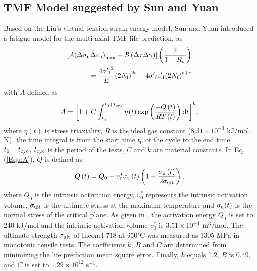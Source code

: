 \documentclass[preprint,5p,twocolumn,10pt,sort&compress]{elsarticle}
\begin{document}
\subsection{TMF Model suggested by Sun and Yuan}
Based on the Liu's virtual tension strain energy model, Sun and Yuan \cite{SUN2019228} introduced a fatigue model for the multi-axial TMF life prediction, as
\begin{equation}
\begin{aligned}
\left[ {A{{\left( {\Delta {\sigma _{\rm n}}\Delta {\varepsilon _{\rm n}}} \right)}_{\max }} + B\left( {\Delta \tau \Delta \gamma } \right)} \right]\left( {\frac{2}{{1 - {R_\sigma }}}} \right)\\
= \frac{{4{{\sigma '}_{\rm f}}^2}}{E}{\left( {2{N_{\rm f}}} \right)^{2b}} + 4{{\sigma '}_{\rm f}}{{\varepsilon '}_{\rm f}}{\left( {2{N_{\rm f}}} \right)^{b + c}}
\end{aligned}
\label{Equ:TMF_model}
\end{equation}
with $A$ defined as
\begin{equation}
A = {\left[ {1 + C\int_{{t_0}}^{{t_0} + {t_{\rm cyc}}} {\eta \left( t \right)\exp \left( {\frac{{ - Q\left( t \right)}}{{RT\left( t \right)}}} \right){\rm{d}}t} } \right]^k},
\label{Equ:A}
\end{equation}
where $\eta \left( t \right)$ is stress triaxiality, $R$ is the ideal gas constant ($8.31\times10^{-3}$ kJ/mol$\cdot$K), the time integral is from the start time $t_0$ of the cycle to the end time $t_0 + t_{\rm cyc}$, $t_{\rm cyc}$ is the period of the tests, $C$ and $k$ are material constants.
In Eq. (\ref{Equ:A}), $Q$ is defined as \cite{Warren2006,Warren2008}
\begin{equation}
Q\left( t \right) = {Q_0} - \upsilon _0^*{\sigma _{\rm n}}\left( t \right)\left( {1 - \frac{{{\sigma _{\rm n}}\left( t \right)}}{{2{\sigma _{\rm ult}}}}} \right),
\label{Equ:creep_activation_energy}
\end{equation}
where $Q_0$ is the intrinsic activation energy, $\upsilon _0^*$ represents the intrinsic activation volume, $\sigma_{\rm ult}$ is the ultimate stress at the maximum temperature and $\sigma_{\rm n}(t)$ is the normal stress of the critical plane.
As given in \cite{Warren2008}, the activation energy $Q_0$ is set to 240 kJ/mol and the intrinsic activation volume $\upsilon _0^*$ is $3.51\times10^{-4}$ $\rm{m}^{3}/\rm{mol}$. The ultimate strength $\sigma_{\rm ult}$ of Inconel 718 at 650$^\circ$C was measured as $1305$ MPa in monotonic tensile tests. The coefficients $k$, $B$ and $C$ are determined from minimizing the life prediction mean square error. Finally, $k$ equals 1.2, $B$ is 0.49, and $C$ is set to $1.29\times10^{12}$ s$^{-1}$.
\end{document}
